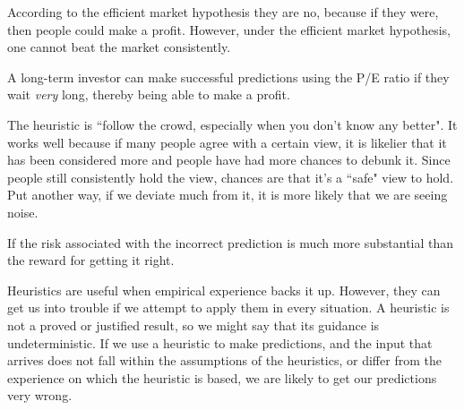 \documentclass[12pt]{article}
\begin{document}
\begin{enumerate}
According to the efficient market hypothesis they are no, because if they were,
then people could make a profit. However, under the efficient market hypothesis,
one cannot beat the market consistently.


A long-term investor can make successful predictions using the P/E ratio if they wait
\textit{very} long, thereby being able to make a profit.


The heuristic is ``follow the crowd, especially when you don't know any better".
It works well because if many people agree with a certain view, it is likelier that
it has been considered more and people have had more chances to debunk it.
Since people still consistently hold the view, chances are that it's a ``safe" view
to hold. Put another way, if we deviate much from it, it is more likely that
we are seeing noise.


If the risk associated with the incorrect prediction is much more substantial than the
reward for getting it right.


Heuristics are useful when empirical experience backs it up. However, they can
get us into trouble if we attempt to apply them in every situation. A heuristic
is not a proved or justified result, so we might say that its guidance is undeterministic.
If we use a heuristic to make predictions, and the input that arrives does not
fall within the assumptions of the heuristics, or differ from the experience on
which the heuristic is based, we are likely to get our predictions very wrong.

\end{enumerate}


\end{document}
